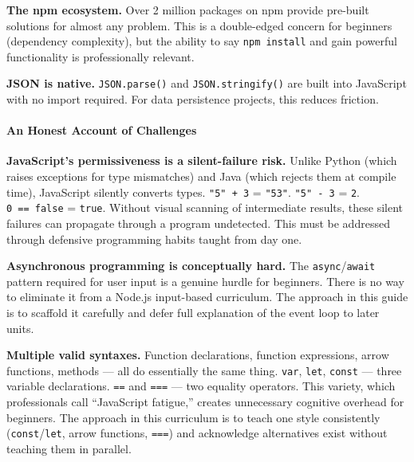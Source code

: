 \documentclass[
  justified,
  openright,
]{tufte-book}
\let\subsection\paragraph
\let\paragraph\paragraph
\let\subsection\paragraph
\let\paragraph\paragraph
\begin{document}
\textbf{The npm ecosystem.} Over 2 million packages on npm provide
pre-built solutions for almost any problem.
 This is a double-edged
concern for beginners (dependency complexity), but the ability to say
\texttt{npm\ install} and gain powerful functionality is professionally
relevant.

\textbf{JSON is native.} \texttt{JSON.parse()} and
\texttt{JSON.stringify()} are built into JavaScript with no import
required. For data persistence projects, this reduces friction.

\subsection{An Honest Account of
Challenges}\label{an-honest-account-of-challenges}

\textbf{JavaScript's permissiveness is a silent-failure risk.} Unlike
Python (which raises exceptions for type mismatches) and Java (which
rejects them at compile time), JavaScript silently converts types.
\texttt{"5"\ +\ 3} = \texttt{"53"}. \texttt{"5"\ -\ 3} = \texttt{2}.
\texttt{0\ ==\ false} = \texttt{true}. Without visual scanning of
intermediate results, these silent failures can propagate through a
program undetected. This must be addressed through defensive programming
habits taught from day one.

\textbf{Asynchronous programming is conceptually hard.} The
\texttt{async}/\texttt{await} pattern required for user input is a
genuine hurdle for beginners. There is no way to eliminate it from a
Node.js input-based curriculum. The approach in this guide is to
scaffold it carefully and defer full explanation of the event loop to
later units.

\textbf{Multiple valid syntaxes.} Function declarations, function
expressions, arrow functions, methods --- all do essentially the same
thing. \texttt{var}, \texttt{let}, \texttt{const} --- three variable
declarations. \texttt{==} and \texttt{===} --- two equality operators.
This variety, which professionals call ``JavaScript fatigue,'' creates
unnecessary cognitive overhead for beginners. The approach in this
curriculum is to teach one style consistently
(\texttt{const}/\texttt{let}, arrow functions, \texttt{===}) and
acknowledge alternatives exist without teaching them in parallel.
\end{document}
